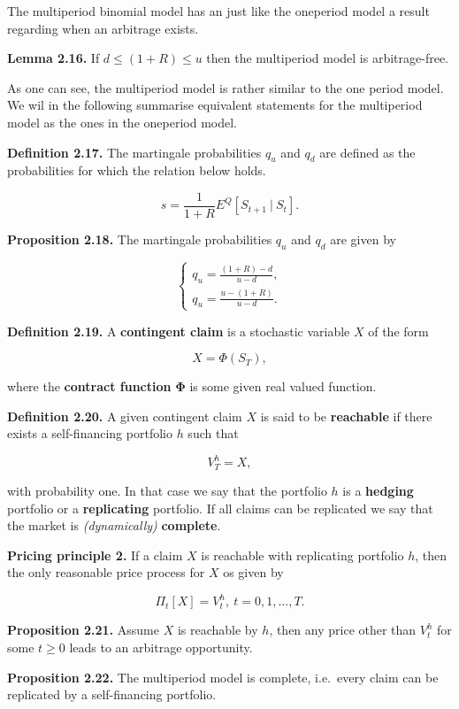 \documentclass[
]{article}
\begin{document}
The multiperiod binomial model has an just like the oneperiod model a
result regarding when an arbitrage exists.

\textbf{Lemma 2.16.} If \(d\le (1+R)\le u\) then the multiperiod model
is arbitrage-free.

As one can see, the multiperiod model is rather similar to the one
period model. We wil in the following summarise equivalent statements
for the multiperiod model as the ones in the oneperiod model.

\textbf{Definition 2.17.} The martingale probabilities \(q_u\) and
\(q_d\) are defined as the probabilities for which the relation below
holds.

\[
s=\frac{1}{1+R}E^Q[S_{t+1}\ \vert\ S_t].
\]

\textbf{Proposition 2.18.} The martingale probabilities \(q_u\) and
\(q_d\) are given by

\[
\left\{\begin{matrix}q_u=\frac{(1+R)-d}{u-d},\\ q_u=\frac{u-(1+R)}{u-d}.\end{matrix}\right.
\]

\textbf{Definition 2.19.} A \textbf{contingent claim} is a stochastic
variable \(X\) of the form

\[
X=\Phi(S_T),
\]

where the \textbf{contract function} \(\mathbf{\Phi}\) is some given
real valued function.

\textbf{Definition 2.20.} A given contingent claim \(X\) is said to be
\textbf{reachable} if there exists a self-financing portfolio \(h\) such
that

\[
V_T^h=X,
\]

with probability one. In that case we say that the portfolio \(h\) is a
\textbf{hedging} portfolio or a \textbf{replicating} portfolio. If all
claims can be replicated we say that the market is \emph{(dynamically)}
\textbf{complete}.

\textbf{Pricing principle 2.} If a claim \(X\) is reachable with
replicating portfolio \(h\), then the only reasonable price process for
\(X\) os given by

\[
\Pi_t[X]=V_t^h,\ t=0,1,...,T.
\]

\textbf{Proposition 2.21.} Assume \(X\) is reachable by \(h\), then any
price other than \(V_t^h\) for some \(t\ge 0\) leads to an arbitrage
opportunity.

\textbf{Proposition 2.22.} The multiperiod model is complete, i.e.~every
claim can be replicated by a self-financing portfolio.
\end{document}
